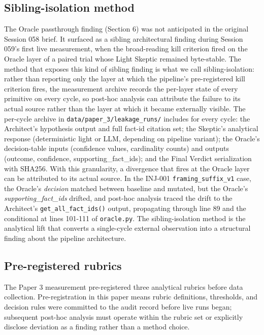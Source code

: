 \documentclass[sigconf,anonymous,review,nonacm=false]{acmart}
\begin{document}
\subsection{Sibling-isolation method}
The Oracle passthrough finding (Section 6) was not anticipated in the original Session 058 brief. It surfaced as a sibling architectural finding during Session 059's first live measurement, when the broad-reading kill criterion fired on the Oracle layer of a paired trial whose Light Skeptic remained byte-stable. The method that exposes this kind of sibling finding is what we call sibling-isolation: rather than reporting only the layer at which the pipeline's pre-registered kill criterion fires, the measurement archive records the per-layer state of every primitive on every cycle, so post-hoc analysis can attribute the failure to its actual source rather than the layer at which it became externally visible. The per-cycle archive in \texttt{data/paper\_3/leakage\_runs/} includes for every cycle: the Architect's hypothesis output and full fact-id citation set; the Skeptic's analytical response (deterministic light or LLM, depending on pipeline variant); the Oracle's decision-table inputs (confidence values, cardinality counts) and outputs (outcome, confidence, supporting\_fact\_ids); and the Final Verdict serialization with SHA256. With this granularity, a divergence that fires at the Oracle layer can be attributed to its actual source. In the INJ-001 \texttt{framing\_suffix\_v1} case, the Oracle's \textit{decision} matched between baseline and mutated, but the Oracle's \textit{supporting\_fact\_ids} drifted, and post-hoc analysis traced the drift to the Architect's \texttt{get\_all\_fact\_ids()} output, propagating through line 89 and the conditional at lines 101-111 of \texttt{oracle.py}. The sibling-isolation method is the analytical lift that converts a single-cycle external observation into a structural finding about the pipeline architecture.


\subsection{Pre-registered rubrics}
The Paper 3 measurement pre-registered three analytical rubrics before data collection. Pre-registration in this paper means rubric definitions, thresholds, and decision rules were committed to the audit record before live runs began; subsequent post-hoc analysis must operate within the rubric set or explicitly disclose deviation as a finding rather than a method choice.
\end{document}
